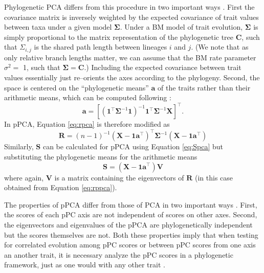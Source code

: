 \documentclass[a4paper,12pt]{article}
\begin{document}
Phylogenetic PCA differs from this procedure in two important ways \citep{Revell2008,Polly2013} . First the covariance matrix is inversely weighted by the expected covariance of trait values between taxa under a given model $\mathbf{\Sigma}$. Under a BM model of trait evolution, $\mathbf{\Sigma}$ is simply proportional to the matrix representation of the phylogenetic tree $\mathbf{C}$, such that $\Sigma_{i,j}$ is the shared path length between lineages $i$ and $j$. (We note that as only relative branch lengths matter, we can assume that the BM rate parameter $\sigma^2=$ 1, such that $\mathbf{\Sigma}=\mathbf{C}$.) Including the expected covariance between trait values essentially just re--orients the axes according to the phylogeny. Second, the space is centered on the ``phylogenetic means'' $\mathbf{a}$ of the traits rather than their arithmetic means, which can be computed following \citet{RevellHarmon2008}:
\begin{equation}\label{eq:phymean}
\mathbf{a}=[(\mathbf{1}^\intercal \mathbf{\Sigma}^{-1} \mathbf{1})^{-1} 
\mathbf{1}^\intercal \mathbf{\Sigma}^{-1} \mathbf{X}]^\intercal.
\end{equation}
In pPCA, Equation \ref{eq:rpca} is therefore modified as
\begin{equation}\label{eq:rppca}
\mathbf{R} = (n-1)^{-1}(\mathbf{X} - \mathbf{1a}^\intercal)^\intercal \mathbf{\Sigma}^{-1} (\mathbf{X} - \mathbf{1a}^\intercal)
\end{equation}
Similarly, $\mathbf{S}$ can be calculated for pPCA using Equation \ref{eq:Spca} but substituting the phylogenetic means for the arithmetic means
\begin{equation}\label{eq:Sppca}
\mathbf{S}=(\mathbf{X} - \mathbf{1a}^\intercal)\mathbf{V}
\end{equation}
where again, $\mathbf{V}$ is a matrix containing the eigenvectors of $\mathbf{R}$ (in this case obtained from Equation \ref{eq:rppca}).

The properties of pPCA differ from those of PCA in two important ways \citep{Revell2008, Polly2013}. First, the scores of each pPC axis are not independent of scores on other axes. Second, the eigenvectors and eigenvalues of the pPCA are phylogenetically independent but the scores themselves are not. Both these properties imply that when testing for correlated evolution among pPC scores or between pPC scores from one axis an another trait, it is necessary analyze the pPC scores in a phylogenetic framework, just as one would with any other trait \citep{Revell2008, Polly2013}. 
\end{document}
